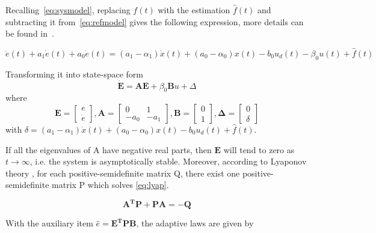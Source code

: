 Recalling~\eqref{eq:sysmodel}, replacing $f(t)$ with the estimation $\hat{f}(t)$ and subtracting it from~\eqref{eq:refmodel} gives the following expression, more details can be found in~\cite{Qingson:2016}.

\begin{equation}
  \ddot{e}(t) + a_1\dot{e}(t) + a_0\dot{e}(t) =  (a_1-\alpha_1)\dot{x}(t) + (a_0-\alpha_0)x(t) - b_0u_d(t) - \beta_0u(t) + \hat{f}(t)
\end{equation}

Transforming it into state-space form
\begin{equation}
  \label{eq:stateSpaceError}
  \mathbf{\dot{E} = AE} + \beta_0\mathbf{B}u + \Delta
\end{equation}
where
\begin{equation}
  \label{eq:matrices}
  \mathbf{E} =
    \begin{bmatrix}
       e\\[0.3em]
       \dot{e}
     \end{bmatrix},
  \mathbf{A} =
    \begin{bmatrix}
       0 & 1\\[0.3em]
       -a_0 & -a_1
     \end{bmatrix},
  \mathbf{B} =
    \begin{bmatrix}
        0\\[0.3em]
        1
    \end{bmatrix},
    \mathbf{\Delta} =
      \begin{bmatrix}
          0\\[0.3em]
          \delta
      \end{bmatrix}
\end{equation}
with $\delta = (a_1-\alpha_1)\dot{x}(t) + (a_0-\alpha_0)x(t) - b_0u_d(t) + \hat{f}(t)$.

If all the eigenvalues of A have negative real parts, then $\mathbf{E}$ will tend to zero as  $t \to \infty$, i.e. the system is asymptotically stable. Moreover, according to Lyaponov theory \cite{Ljung:2003}, for each positive-semidefinite matrix Q, there exist one positive-semidefinite matrix P which solves \eqref{eq:lyap}.

\begin{equation}
  \label{eq:lyap}
  \mathbf{A^TP + PA = -Q}
\end{equation}

With the auxiliary item $\hat{e} = \mathbf{E^TPB}$, the adaptive laws are given by

